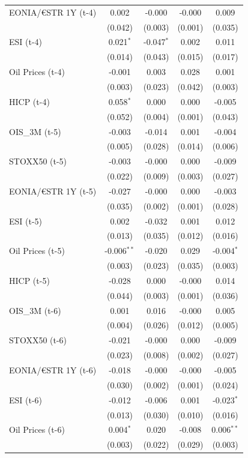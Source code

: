 \begin{longtable}[t]{lcccc}
EONIA/€STR 1Y (t-4) & 0.002 & -0.000 & -0.000 & 0.009\\
 & (0.042) & (0.003) & (0.001) & (0.035)\\
ESI (t-4) & 0.021$^{*}$ & -0.047$^{*}$ & 0.002 & 0.011\\
 & (0.014) & (0.043) & (0.015) & (0.017)\\
Oil Prices (t-4) & -0.001 & 0.003 & 0.028 & 0.001\\
 & (0.003) & (0.023) & (0.042) & (0.003)\\
HICP (t-4) & 0.058$^{*}$ & 0.000 & 0.000 & -0.005\\
 & (0.052) & (0.004) & (0.001) & (0.043)\\
OIS\_3M (t-5) & -0.003 & -0.014 & 0.001 & -0.004\\
 & (0.005) & (0.028) & (0.014) & (0.006)\\
STOXX50 (t-5) & -0.003 & -0.000 & 0.000 & -0.009\\
 & (0.022) & (0.009) & (0.003) & (0.027)\\
EONIA/€STR 1Y (t-5) & -0.027 & -0.000 & 0.000 & -0.003\\
 & (0.035) & (0.002) & (0.001) & (0.028)\\
ESI (t-5) & 0.002 & -0.032 & 0.001 & 0.012\\
 & (0.013) & (0.035) & (0.012) & (0.016)\\
Oil Prices (t-5) & -0.006$^{**}$ & -0.020 & 0.029 & -0.004$^{*}$\\
 & (0.003) & (0.023) & (0.035) & (0.003)\\
HICP (t-5) & -0.028 & 0.000 & -0.000 & 0.014\\
 & (0.044) & (0.003) & (0.001) & (0.036)\\
OIS\_3M (t-6) & 0.001 & 0.016 & -0.000 & 0.005\\
 & (0.004) & (0.026) & (0.012) & (0.005)\\
STOXX50 (t-6) & -0.021 & -0.000 & 0.000 & -0.009\\
 & (0.023) & (0.008) & (0.002) & (0.027)\\
EONIA/€STR 1Y (t-6) & -0.018 & -0.000 & -0.000 & -0.005\\
 & (0.030) & (0.002) & (0.001) & (0.024)\\
ESI (t-6) & -0.012 & -0.006 & 0.001 & -0.023$^{*}$\\
 & (0.013) & (0.030) & (0.010) & (0.016)\\
Oil Prices (t-6) & 0.004$^{*}$ & 0.020 & -0.008 & 0.006$^{**}$\\
 & (0.003) & (0.022) & (0.029) & (0.003)\\

\end{longtable}
